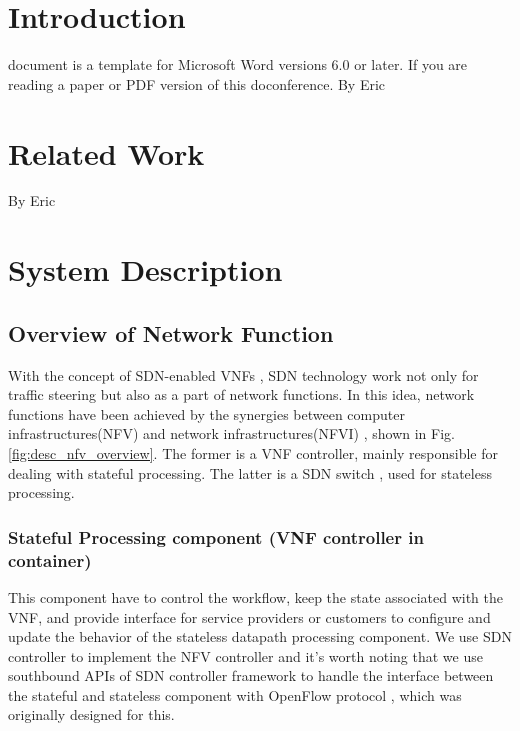 \documentclass[journal]{IEEEtran}
\begin{document}
\section{Introduction}
 document is a template for Microsoft Word versions 6.0 or later. If you are reading a paper or PDF version of this doconference.
By Eric





\section{Related Work}
By Eric





\section{System Description}
\subsection{Overview of Network Function}\label{ssec:desc_nfv_overview}
With the concept of SDN-enabled VNFs \cite{sdn-enabled} \cite{manage-nve}, SDN technology work not only for traffic steering but also as a part of network functions. In this idea, network functions have been achieved by the synergies between computer infrastructures(NFV) and network infrastructures(NFVI) \cite{nfv2014-v121}\cite{nfv2014-v111}\cite{nfv2015}, shown in Fig. \ref{fig:desc_nfv_overview}. The former is a VNF controller, mainly responsible for dealing with stateful processing. The latter is a SDN switch \cite{sp:openflow1.3}, used for stateless processing.

\subsubsection{Stateful Processing component (VNF controller in container)}
This component have to control the workflow, keep the state associated with the VNF, and provide interface for service providers or customers to configure and update the behavior of the stateless datapath processing component. We use SDN controller to implement the NFV controller and it’s worth noting that we use southbound APIs of SDN controller framework to handle the interface between the stateful and stateless component with OpenFlow protocol \cite{onf}, which was originally designed for this.
\end{document}
